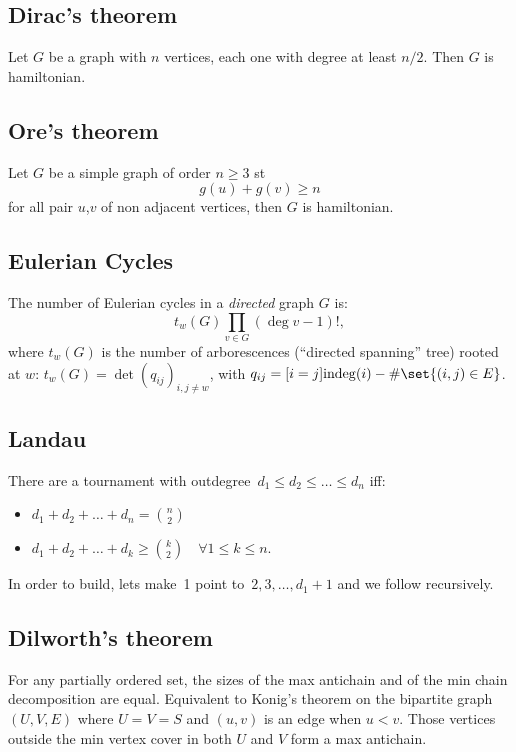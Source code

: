 \subsection{Dirac's theorem} Let $G$ be a graph with $n$ vertices, each one with degree at least $n/2$. Then $G$ is hamiltonian.

\subsection{Ore's theorem} Let $G$ be a simple graph of order $n \geq 3$ st
\[g(u) + g(v) \geq n \] for all pair $u$,$v$ of non adjacent vertices, then $G$ is hamiltonian.

\subsection{Eulerian Cycles}
The number of Eulerian cycles in a \emph{directed} graph $G$ is:
\begin{equation*}
	t_w(G) \prod_{v \in G} (\deg v - 1)!,
\end{equation*}
where $t_w(G)$ is the number of arborescences (``directed spanning'' tree) rooted at $w$: $t_w(G) = \det\left( q_{ij} \right)_{i,j \neq w}$, with $q_{ij} = [i=j] \mathrm{indeg}(i) - \# \set{(i,j) \in E}$.

\subsection{Landau}
There are a tournament with outdegree~$d_1 \leq d_2 \leq \ldots \leq d_n$ iff:
\begin{itemize}
\item $d_1 + d_2 + \ldots + d_n = {n \choose 2}$\newline
\item $d_1 + d_2 + \ldots + d_k \geq {k \choose 2} \quad \forall 1 \leq k \leq n.$
\end{itemize}
In order to build, lets make~1 point to~$2, 3, \ldots, d_1 + 1$ and we follow recursively.

\subsection{Dilworth's theorem}
For any partially ordered set, the sizes of the max antichain and of the min chain decomposition are equal. Equivalent to Konig's theorem on the bipartite graph $(U,V,E)$ where $U=V=S$ and $(u,v)$ is an edge when $u<v$. Those vertices outside the min vertex cover in both $U$ and $V$ form a max antichain.


